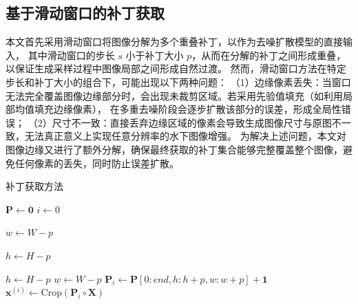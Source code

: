 \subsection{基于滑动窗口的补丁获取}
本文首先采用滑动窗口将图像分解为多个重叠补丁，以作为去噪扩散模型的直接输入，
其中滑动窗口的步长 $s$ 小于补丁大小 $p$，从而在分解的补丁之间形成重叠，以保证生成采样过程中图像局部之间形成自然过渡。
然而，滑动窗口方法在特定步长和补丁大小的组合下，可能出现以下两种问题：
（1）边缘像素丢失：当窗口无法完全覆盖图像边缘部分时，会出现未裁剪区域。若采用先验值填充（如利用局部均值填充边缘像素），
在多重去噪阶段会逐步扩散该部分的误差，形成全局性错误；
（2）尺寸不一致：直接丢弃边缘区域的像素会导致生成图像尺寸与原图不一致，无法真正意义上实现任意分辨率的水下图像增强。
为解决上述问题，本文对图像边缘又进行了额外分解，确保最终获取的补丁集合能够完整覆盖整个图像，避免任何像素的丢失，同时防止误差扩散。
\begin{algorithm}[ht]
\caption{补丁获取方法}
\label{alg:patch}


$\bm{P} \gets \mathbf{0}$ \quad {}
$i \gets 0$ \quad {}


$w \gets W - p$\;


$h \gets H - p$\;


$h \gets H - p$\;
$w \gets W - p$\;
$\bm{P}_i \gets \bm{P}[0:end, h:h + p, w:w + p] + \mathbf{1}$\;
$\mathbf{x}^{(i)} \gets \text{Crop}(\bm{P}_i \circ \bm{X})$\;
\end{algorithm}

